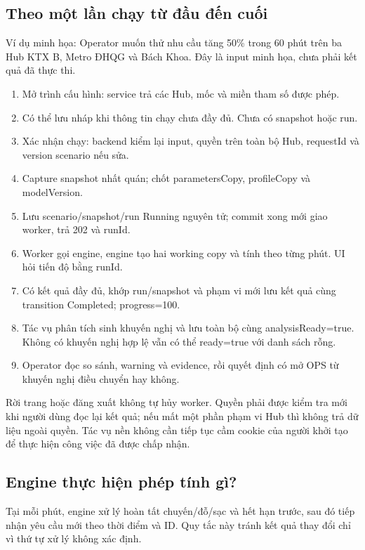 \documentclass[12pt,a4paper]{article}
\begin{document}
\subsection{Theo một lần chạy từ đầu đến cuối}
Ví dụ minh họa: Operator muốn thử nhu cầu tăng 50\% trong 60 phút trên ba Hub KTX B, Metro ĐHQG và Bách Khoa. Đây là input minh họa, chưa phải kết quả đã thực thi.

\begin{enumerate}
\item Mở trình cấu hình: service trả các Hub, mốc và miền tham số được phép.
\item Có thể lưu nháp khi thông tin chạy chưa đầy đủ. Chưa có snapshot hoặc run.
\item Xác nhận chạy: backend kiểm lại input, quyền trên toàn bộ Hub, requestId và version scenario nếu sửa.
\item Capture snapshot nhất quán; chốt parametersCopy, profileCopy và modelVersion.
\item Lưu scenario/snapshot/run Running nguyên tử; commit xong mới giao worker, trả 202 và runId.
\item Worker gọi engine, engine tạo hai working copy và tính theo từng phút. UI hỏi tiến độ bằng runId.
\item Có kết quả đầy đủ, khớp run/snapshot và phạm vi mới lưu kết quả cùng transition Completed; progress=100.
\item Tác vụ phân tích sinh khuyến nghị và lưu toàn bộ cùng analysisReady=true. Không có khuyến nghị hợp lệ vẫn có thể ready=true với danh sách rỗng.
\item Operator đọc so sánh, warning và evidence, rồi quyết định có mở OPS từ khuyến nghị điều chuyển hay không.
\end{enumerate}

Rời trang hoặc đăng xuất không tự hủy worker. Quyền phải được kiểm tra mới khi người dùng đọc lại kết quả; nếu mất một phần phạm vi Hub thì không trả dữ liệu ngoài quyền. Tác vụ nền không cần tiếp tục cầm cookie của người khởi tạo để thực hiện công việc đã được chấp nhận.

\subsection{Engine thực hiện phép tính gì?}
Tại mỗi phút, engine xử lý hoàn tất chuyến/đỗ/sạc và hết hạn trước, sau đó tiếp nhận yêu cầu mới theo thời điểm và ID. Quy tắc này tránh kết quả thay đổi chỉ vì thứ tự xử lý không xác định.
\end{document}
